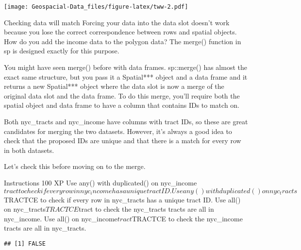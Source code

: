 \documentclass[]{article}
\newenvironment{Shaded}{\begin{snugshade}}{\end{snugshade}}
\newcommand{\CommentTok}[1]{\textcolor[rgb]{0.56,0.35,0.01}{\textit{#1}}}
\newcommand{\KeywordTok}[1]{\textcolor[rgb]{0.13,0.29,0.53}{\textbf{#1}}}
\newcommand{\NormalTok}[1]{#1}
\newcommand{\OperatorTok}[1]{\textcolor[rgb]{0.81,0.36,0.00}{\textbf{#1}}}
\begin{document}
\texttt{[image: Geospacial-Data\_files/figure-latex/tww-2.pdf]}

Checking data will match Forcing your data into the data slot doesn't
work because you lose the correct correspondence between rows and
spatial objects. How do you add the income data to the polygon data? The
merge() function in sp is designed exactly for this purpose.

You might have seen merge() before with data frames. sp::merge() has
almost the exact same structure, but you pass it a Spatial*** object and
a data frame and it returns a new Spatial*** object where the data slot
is now a merge of the original data slot and the data frame. To do this
merge, you'll require both the spatial object and data frame to have a
column that contains IDs to match on.

Both nyc\_tracts and nyc\_income have columns with tract IDs, so these
are great candidates for merging the two datasets. However, it's always
a good idea to check that the proposed IDs are unique and that there is
a match for every row in both datasets.

Let's check this before moving on to the merge.

Instructions 100 XP Use any() with duplicated() on
nyc\_income\(tract to check if every row in nyc_income has a unique tract ID. Use any() with duplicated() on nyc_tracts\)TRACTCE
to check if every row in nyc\_tracts has a unique tract ID. Use all() on
nyc\_tracts\(TRACTCE %
\)tract to check the nyc\_tracts tracts are all in nyc\_income. Use
all() on nyc\_income\(tract %
\)TRACTCE to check the nyc\_income tracts are all in nyc\_tracts.

\begin{Shaded}
\end{Shaded}

\begin{verbatim}
## [1] FALSE
\end{verbatim}

\begin{Shaded}
\end{Shaded}
\end{document}
